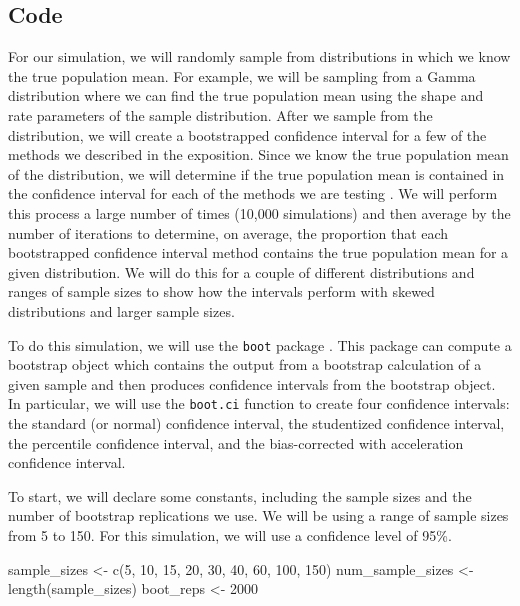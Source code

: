 \documentclass[12pt]{article}
\newenvironment{Shaded}{\begin{snugshade}}{\end{snugshade}}
\newcommand{\DecValTok}[1]{\textcolor[rgb]{0.00,0.00,0.81}{#1}}
\newcommand{\FunctionTok}[1]{\textcolor[rgb]{0.00,0.00,0.00}{#1}}
\newcommand{\NormalTok}[1]{#1}
\newcommand{\OtherTok}[1]{\textcolor[rgb]{0.56,0.35,0.01}{#1}}
\begin{document}
\hypertarget{code}{%
\subsection{Code}\label{code}}

For our simulation, we will randomly sample from distributions in which
we know the true population mean. For example, we will be sampling from
a Gamma distribution where we can find the true population mean using
the shape and rate parameters of the sample distribution. After we
sample from the distribution, we will create a bootstrapped confidence
interval for a few of the methods we described in the exposition. Since
we know the true population mean of the distribution, we will determine
if the true population mean is contained in the confidence interval for
each of the methods we are testing \citep{Guillaume21}. We will perform
this process a large number of times (10,000 simulations) and then
average by the number of iterations to determine, on average, the
proportion that each bootstrapped confidence interval method contains
the true population mean for a given distribution. We will do this for a
couple of different distributions and ranges of sample sizes to show how
the intervals perform with skewed distributions and larger sample sizes.

To do this simulation, we will use the \texttt{boot} package
\citep{boot}. This package can compute a bootstrap object which contains
the output from a bootstrap calculation of a given sample and then
produces confidence intervals from the bootstrap object. In particular,
we will use the \texttt{boot.ci} function to create four confidence
intervals: the standard (or normal) confidence interval, the studentized
confidence interval, the percentile confidence interval, and the
bias-corrected with acceleration confidence interval.

To start, we will declare some constants, including the sample sizes and
the number of bootstrap replications we use. We will be using a range of
sample sizes from 5 to 150. For this simulation, we will use a
confidence level of 95\%.

\begin{Shaded}
\begin{Highlighting}[]
\NormalTok{sample\_sizes }\OtherTok{\textless{}{-}} \FunctionTok{c}\NormalTok{(}\DecValTok{5}\NormalTok{, }\DecValTok{10}\NormalTok{, }\DecValTok{15}\NormalTok{, }\DecValTok{20}\NormalTok{, }\DecValTok{30}\NormalTok{, }\DecValTok{40}\NormalTok{, }\DecValTok{60}\NormalTok{, }\DecValTok{100}\NormalTok{, }\DecValTok{150}\NormalTok{)}
\NormalTok{num\_sample\_sizes }\OtherTok{\textless{}{-}} \FunctionTok{length}\NormalTok{(sample\_sizes)}
\NormalTok{boot\_reps }\OtherTok{\textless{}{-}} \DecValTok{2000}
\end{Highlighting}
\end{Shaded}
\end{document}
